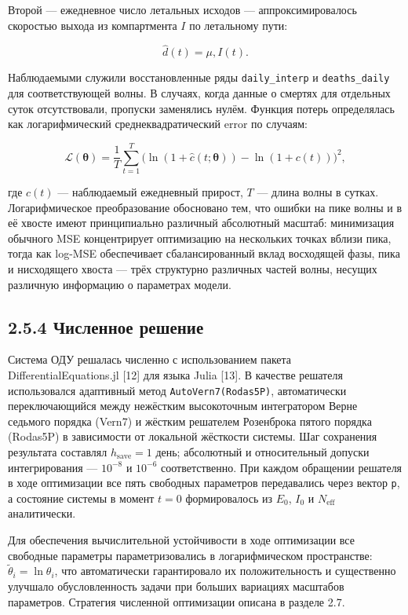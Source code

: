 \documentclass[12pt]{article}
\begin{document}
Второй --- ежедневное число летальных исходов --- аппроксимировалось
скоростью выхода из компартмента \(I\) по летальному пути:

\[\hat{d}(t) = \mu, I(t).\]

Наблюдаемыми служили восстановленные ряды \texttt{daily\_interp} и
\texttt{deaths\_daily} для соответствующей волны. В случаях, когда
данные о смертях для отдельных суток отсутствовали, пропуски заменялись
нулём. Функция потерь определялась как логарифмический
среднеквадратический error по случаям:

\[\mathcal{L}(\boldsymbol{\theta}) = \frac{1}{T}\sum_{t=1}^{T} \bigl(\ln(1 + \hat{c}(t;\boldsymbol{\theta})) - \ln(1 + c(t))\bigr)^2,\]

где \(c(t)\) --- наблюдаемый ежедневный прирост, \(T\) --- длина волны в
сутках. Логарифмическое преобразование обосновано тем, что ошибки на
пике волны и в её хвосте имеют принципиально различный абсолютный
масштаб: минимизация обычного MSE концентрирует оптимизацию на
нескольких точках вблизи пика, тогда как log-MSE обеспечивает
сбалансированный вклад восходящей фазы, пика и нисходящего хвоста ---
трёх структурно различных частей волны, несущих различную информацию о
параметрах модели.

\subsection{2.5.4 Численное
решение}\label{ux447ux438ux441ux43bux435ux43dux43dux43eux435-ux440ux435ux448ux435ux43dux438ux435}

Система ОДУ решалась численно с использованием пакета
DifferentialEquations.jl {[}12{]} для языка Julia {[}13{]}. В качестве
решателя использовался адаптивный метод \texttt{AutoVern7(Rodas5P)},
автоматически переключающийся между нежёстким высокоточным интегратором
Верне седьмого порядка (Vern7) и жёстким решателем Розенброка пятого
порядка (Rodas5P) в зависимости от локальной жёсткости системы. Шаг
сохранения результата составлял \(h_{\text{save}} = 1\) день; абсолютный
и относительный допуски интегрирования --- \(10^{-8}\) и \(10^{-6}\)
соответственно. При каждом обращении решателя в ходе оптимизации все
пять свободных параметров передавались через вектор \texttt{p}, а
состояние системы в момент \(t = 0\) формировалось из \(E_0\), \(I_0\) и
\(N_{\text{eff}}\) аналитически.

Для обеспечения вычислительной устойчивости в ходе оптимизации все
свободные параметры параметризовались в логарифмическом пространстве:
\(\tilde{\theta}_i = \ln \theta_i\), что автоматически гарантировало их
положительность и существенно улучшало обусловленность задачи при
больших вариациях масштабов параметров. Стратегия численной оптимизации
описана в разделе 2.7.
\end{document}
